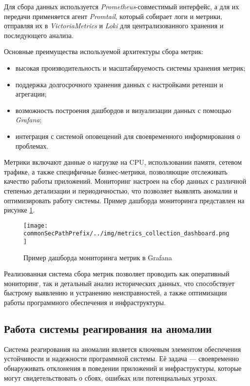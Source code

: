 Для сбора данных используется \textit{Prometheus}-совместимый интерфейс, а для их передачи применяется агент \textit{Promtail}, который собирает логи и метрики, отправляя их в \textit{VictoriaMetrics} и \textit{Loki} для централизованного хранения и последующего анализа.

Основные преимущества используемой архитектуры сбора метрик:

\begin{itemize}
    \item высокая производительность и масштабируемость системы хранения метрик;
    \item поддержка долгосрочного хранения данных с настройками ретеншн и агрегации;
    \item возможность построения дашбордов и визуализации данных с помощью \textit{Grafana};
    \item интеграция с системой оповещений для своевременного информирования о проблемах.
\end{itemize}

Метрики включают данные о нагрузке на CPU, использовании памяти, сетевом трафике, а также специфичные бизнес-метрики, позволяющие отслеживать качество работы приложений. Мониторинг настроен на сбор данных с различной степенью детализации и периодичностью, что позволяет выявлять аномалии и оптимизировать работу системы. Пример дашборда мониторинга представлен на рисунке \ref{fig:metrics_collection_dashboard}.
\begin{figure}[ht]
    \centering
    \texttt{[image: \\commonSecPathPrefix/../img/metrics\_collection\_dashboard.png]}
    \caption{Пример дашборда мониторинга метрик в Grafana}
    \label{fig:metrics_collection_dashboard}
\end{figure}

Реализованная система сбора метрик позволяет проводить как оперативный мониторинг, так и детальный анализ исторических данных, что способствует быстрому выявлению и устранению неисправностей, а также оптимизации работы программного обеспечения и инфраструктуры.


\subsection{Работа системы реагирования на аномалии}

Система реагирования на аномалии является ключевым элементом обеспечения устойчивости и надежности программной системы. Её задача — своевременно обнаруживать отклонения в поведении приложений и инфраструктуры, которые могут свидетельствовать о сбоях, ошибках или потенциальных угрозах.

